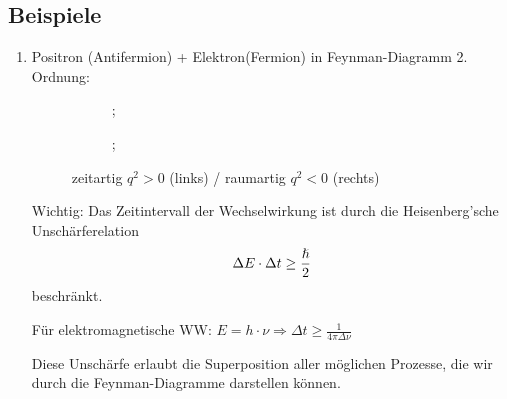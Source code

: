 \documentclass[Ex4_Zusammenfassung.tex]{subfiles}
\begin{document}
\subsection{Beispiele}
	
	\begin{enumerate}
		\item Positron (Antifermion) + Elektron(Fermion) in Feynman-Diagramm 2. Ordnung:
			\begin{figure}[H]
				\centering
					\quad
				\begin{subfigure}[b]{0.4\textwidth}
					;
				\end{subfigure}
				\quad
				\begin{subfigure}[b]{0.4\textwidth}
					;
				\end{subfigure}
				\caption{zeitartig $q^2 >0$ (links) / raumartig $q^2 < 0$ (rechts)}
			\end{figure}
			Wichtig: Das Zeitintervall der Wechselwirkung ist durch die Heisenberg'sche Unschärferelation
			\begin{equation}
				 \Delta E \cdot \Delta t \ge \frac{\hslash}{2}
			\end{equation}
			beschränkt.
			
			Für elektromagnetische WW: $E = h \cdot \nu \Rightarrow \Delta t \ge \frac{1}{4\pi \Delta \nu}$
			
			Diese Unschärfe erlaubt die Superposition aller möglichen Prozesse, die wir durch die Feynman-Diagramme darstellen können.


\end{enumerate}
\end{document}
